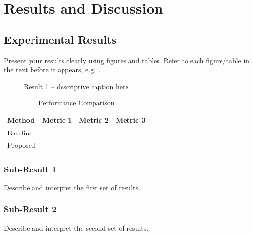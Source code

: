 \chapter{Results and Discussion}
\label{chap:results}

\section{Experimental Results}
\label{sec:results}

Present your results clearly using figures and tables. Refer to each
figure/table in the text before it appears, e.g.\ .

\begin{figure}[htbp]
  \centering
  \caption{Result 1 -- descriptive caption here}
  \label{fig:result1}
\end{figure}

\begin{table}[htbp]
  \centering
  \caption{Performance Comparison}
  \label{tab:comparison}
  \begin{tabular}{llcc}
    \toprule
    \textbf{Method}  & \textbf{Metric 1} & \textbf{Metric 2} & \textbf{Metric 3} \\
    \midrule
    Baseline         & --                & --                & --                \\
    Proposed         & --                & --                & --                \\
    \bottomrule
  \end{tabular}
\end{table}

\subsection{Sub-Result 1}
\label{subsec:result1}

Describe and interpret the first set of results.

\subsection{Sub-Result 2}
\label{subsec:result2}

Describe and interpret the second set of results.

